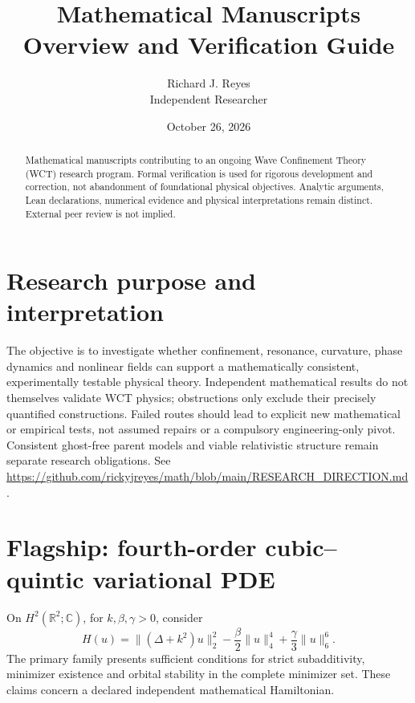 \documentclass[11pt]{article}
\title{Mathematical Manuscripts\\\large Overview and Verification Guide}
\author{Richard J. Reyes\\Independent Researcher}
\date{October 26, 2026}
\begin{document}
\maketitle
\begin{abstract}
Mathematical manuscripts contributing to an ongoing Wave Confinement Theory
(WCT) research program. Formal verification is used for rigorous development
and correction, not abandonment of foundational physical objectives.
Analytic arguments, Lean declarations, numerical evidence and physical
interpretations remain distinct. External peer review is not implied.
\end{abstract}
\section*{Research purpose and interpretation}
The objective is to investigate whether confinement, resonance, curvature,
phase dynamics and nonlinear fields can support a mathematically consistent,
experimentally testable physical theory. Independent mathematical results
do not themselves validate WCT physics; obstructions only exclude their
precisely quantified constructions. Failed routes should lead to explicit
new mathematical or empirical tests, not assumed repairs or a compulsory
engineering-only pivot. Consistent ghost-free parent models and viable
relativistic structure remain separate research obligations.
See \url{https://github.com/rickyjreyes/math/blob/main/RESEARCH_DIRECTION.md}.
\section*{Flagship: fourth-order cubic--quintic variational PDE}
On $H^2(\mathbb R^2;\mathbb C)$, for $k,\beta,\gamma>0$, consider
\[
H(u)=\|(\Delta+k^2)u\|_2^2-\frac{\beta}{2}\|u\|_4^4+
\frac{\gamma}{3}\|u\|_6^6.
\]
The primary family presents sufficient conditions for strict subadditivity,
minimizer existence and orbital stability in the complete minimizer set.
These claims concern a declared independent mathematical Hamiltonian.
\end{document}
